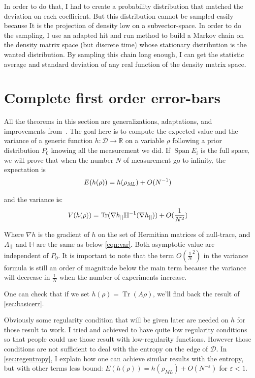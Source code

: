 \documentclass[10pt,a4paper]{report}
\theoremstyle{plain}
\theoremstyle{definition}
\theoremstyle{remark}
\newcommand{\R}{\ensuremath{\mathbb{R}}}
\DeclareMathOperator{\Tr}{Tr}
\DeclareMathOperator{\Span}{Span}
\newcommand{\ml}{_{M\!L}}
\begin{document}
In order to do that, I had to create a probability distribution that matched the
deviation on each coefficient. But this distribution
cannot be sampled easily because It is the projection of density low on a
subvector-space.
In order to do the sampling, I use an adapted hit and run method to build a
Markov chain on the density matrix space (but discrete time) whose stationary
distribution is the wanted distribution. By sampling this chain long enough, I
can get the statistic average and standard deviation of any real function of the
density matrix space.

\section{Complete first order error-bars}\label{sec:errbar}

All the theorems in this section are generalizations,
adaptations, and improvements from~\cite{SPRAL17}. The goal here is to compute
the expected value and the variance of a generic function $h : \mathcal{D} \to
\R$ on a variable $\rho$ following a prior distribution $P_0$
knowing all the measurement
we did. If $\Span E_i$ is the full space,
we will prove that when the number $N$ of measurement go to infinity, the
expectation is
\[E(h(\rho)) = h(\rho\ml) + O(N\inv)\]

and the variance is:
\[V(h(\rho)) = \Tr(\nabla h\pr \mathbb H\inv(\nabla h\pr)) +O(\frac 1 {N^2})\]

Where $\nabla h$ is the gradient of $h$ on the set of Hermitian
matrices of null-trace, and $A_{||}$ and $\mathbb H$ are the same as below
\cref{eqn:var}. Both asymptotic value are independent of $P_0$. It is important
to note that the term $O(\frac 1 N^2)$ in the variance formula
is still an order of magnitude below
the main term because the variance will decrease in $\frac 1 N$ when the number
of experiments increase.

One can check that if we set
$h(\rho) = \Tr(A\rho)$, we'll find back the result of \cref{sec:basicerr}.

Obviously some
regularity condition that will be given later are needed on $h$ for those result
to work.
I tried and achieved to have quite low regularity conditions so that people could
use those result with low-regularity functions. However those conditions are not
sufficient to deal with the entropy on the edge of $\mathcal{D}$. In
\cref{sec:regentropy}, I explain how one can achieve similar results with the
entropy, but with other terms less bound: $E(h(\rho)) = h(\rho\ml) +
O(N^{-\varepsilon})$ for $\varepsilon < 1$.
\end{document}
